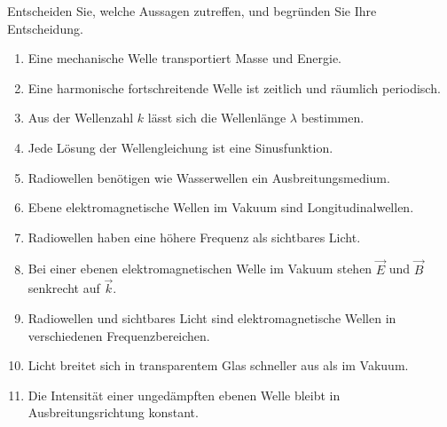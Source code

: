 \begin{ExerciseBlock}
Entscheiden Sie, welche Aussagen zutreffen, und begründen Sie Ihre Entscheidung.
\begin{enumerate}
\item Eine mechanische Welle transportiert Masse und Energie.
\item Eine harmonische fortschreitende Welle ist zeitlich und räumlich periodisch.
\item Aus der Wellenzahl $k$ lässt sich die Wellenlänge $\lambda$ bestimmen.
\item Jede Lösung der Wellengleichung ist eine Sinusfunktion.
\item Radiowellen benötigen wie Wasserwellen ein Ausbreitungsmedium.
\item Ebene elektromagnetische Wellen im Vakuum sind Longitudinalwellen.
\item Radiowellen haben eine höhere Frequenz als sichtbares Licht.
\item Bei einer ebenen elektromagnetischen Welle im Vakuum stehen $\vec E$ und $\vec B$ senkrecht auf $\vec k$.
\item Radiowellen und sichtbares Licht sind elektromagnetische Wellen in verschiedenen Frequenzbereichen.
\item Licht breitet sich in transparentem Glas schneller aus als im Vakuum.
\item Die Intensität einer ungedämpften ebenen Welle bleibt in Ausbreitungsrichtung konstant.
\end{enumerate}
\end{ExerciseBlock}
